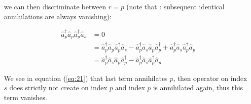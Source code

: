 \documentclass[12p]{article}
\begin{document}
we can then discriminate between $r = p$ (note that : subsequent identical annihilations are always vanishing):

\begin{align}
  \hat{a}^\dagger_p \hat{a}_p \hat{a}^\dagger_p \hat{a}_s & = 0 \\
  & = \hat{a}^\dagger_p \hat{a}_p \hat{a}^\dagger_p \hat{a}_s - \hat{a}^\dagger_p \hat{a}_s \hat{a}_p \hat{a}^\dagger_p  + \hat{a}^\dagger_p \hat{a}_s \hat{a}^\dagger_p \hat{a}_p \\
  & = \hat{a}^\dagger_p \hat{a}_s \hat{a}_p \hat{a}^\dagger_p  - \hat{a}^\dagger_p \hat{a}_s \hat{a}^\dagger_p \hat{a}_p \label{eq:21}
\end{align}

We see in equation (\ref{eq:21}) that last term annihilates $p$, then operator on index $s$ does strictly not create on index $p$ and index $p$ is annihilated again, thus this term vanishes.
\end{document}
